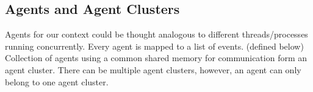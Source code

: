     \subsection{Agents and Agent Clusters}
        Agents for our context could be thought analogous to different threads/processes running concurrently. 
        Every agent is mapped to a list of events. (defined below) 
        Collection of agents using a common shared memory for communication form an agent cluster. 
        There can be multiple agent clusters, however, an agent can only belong to one agent cluster. 
       
            